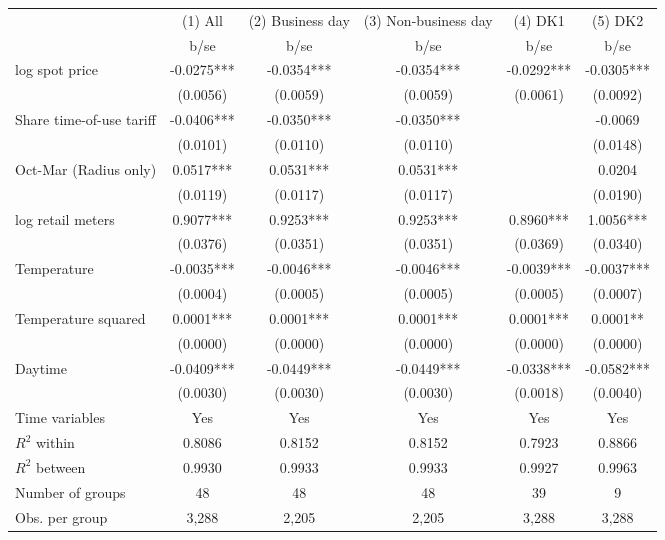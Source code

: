 \begin{tabular}{lccccc}\toprule
                    &     (1) All   &(2) Business day   &(3) Non-business day   &     (4) DK1   &     (5) DK2   \\
                    &        b/se   &        b/se   &        b/se   &        b/se   &        b/se   \\
\midrule
log spot price      &     -0.0275***&     -0.0354***&     -0.0354***&     -0.0292***&     -0.0305***\\
                    &    (0.0056)   &    (0.0059)   &    (0.0059)   &    (0.0061)   &    (0.0092)   \\
Share time-of-use tariff&     -0.0406***&     -0.0350***&     -0.0350***&               &     -0.0069   \\
                    &    (0.0101)   &    (0.0110)   &    (0.0110)   &               &    (0.0148)   \\
Oct-Mar (Radius only)&      0.0517***&      0.0531***&      0.0531***&               &      0.0204   \\
                    &    (0.0119)   &    (0.0117)   &    (0.0117)   &               &    (0.0190)   \\
log retail meters   &      0.9077***&      0.9253***&      0.9253***&      0.8960***&      1.0056***\\
                    &    (0.0376)   &    (0.0351)   &    (0.0351)   &    (0.0369)   &    (0.0340)   \\
Temperature         &     -0.0035***&     -0.0046***&     -0.0046***&     -0.0039***&     -0.0037***\\
                    &    (0.0004)   &    (0.0005)   &    (0.0005)   &    (0.0005)   &    (0.0007)   \\
Temperature squared &      0.0001***&      0.0001***&      0.0001***&      0.0001***&      0.0001** \\
                    &    (0.0000)   &    (0.0000)   &    (0.0000)   &    (0.0000)   &    (0.0000)   \\
Daytime             &     -0.0409***&     -0.0449***&     -0.0449***&     -0.0338***&     -0.0582***\\
                    &    (0.0030)   &    (0.0030)   &    (0.0030)   &    (0.0018)   &    (0.0040)   \\
Time variables      &         Yes   &         Yes   &         Yes   &         Yes   &         Yes   \\
\midrule
\(R^2\) within      &      0.8086   &      0.8152   &      0.8152   &      0.7923   &      0.8866   \\
\(R^2\) between     &      0.9930   &      0.9933   &      0.9933   &      0.9927   &      0.9963   \\
Number of groups    &          48   &          48   &          48   &          39   &           9   \\
Obs. per group      &       3,288   &       2,205   &       2,205   &       3,288   &       3,288   \\
\bottomrule\end{tabular}
